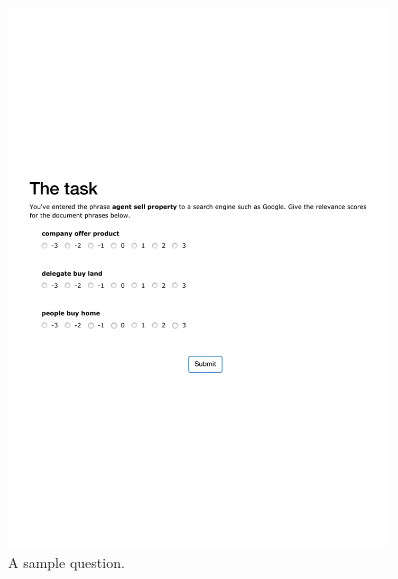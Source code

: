 \begin{figure}
\centering
\includegraphics[width=0.9\textwidth]{figures/task}

\caption{A sample question.}

\label{fig:task}
\end{figure}

